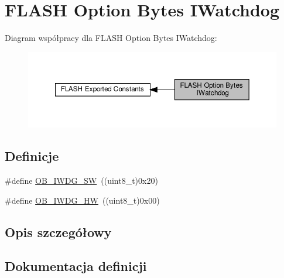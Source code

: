 \hypertarget{group___f_l_a_s_h_ex___option___bytes___i_watchdog}{}\section{F\+L\+A\+SH Option Bytes I\+Watchdog}
\label{group___f_l_a_s_h_ex___option___bytes___i_watchdog}
Diagram współpracy dla F\+L\+A\+SH Option Bytes I\+Watchdog\+:\nopagebreak
\begin{figure}[H]
\begin{center}
\leavevmode
\includegraphics[width=350pt]{group___f_l_a_s_h_ex___option___bytes___i_watchdog}
\end{center}
\end{figure}
\subsection*{Definicje}
\begin{DoxyCompactItemize}
\item 
\#define \hyperlink{group___f_l_a_s_h_ex___option___bytes___i_watchdog_ga5a357e232c955444c3f2ccb9a937ffce}{O\+B\+\_\+\+I\+W\+D\+G\+\_\+\+SW}~((uint8\+\_\+t)0x20)
\item 
\#define \hyperlink{group___f_l_a_s_h_ex___option___bytes___i_watchdog_gadfcbfa963d79c339ec8e2d5a7734e47a}{O\+B\+\_\+\+I\+W\+D\+G\+\_\+\+HW}~((uint8\+\_\+t)0x00)
\end{DoxyCompactItemize}


\subsection{Opis szczegółowy}


\subsection{Dokumentacja definicji}
\mbox{\label{group___f_l_a_s_h_ex___option___bytes___i_watchdog_gadfcbfa963d79c339ec8e2d5a7734e47a}} 
